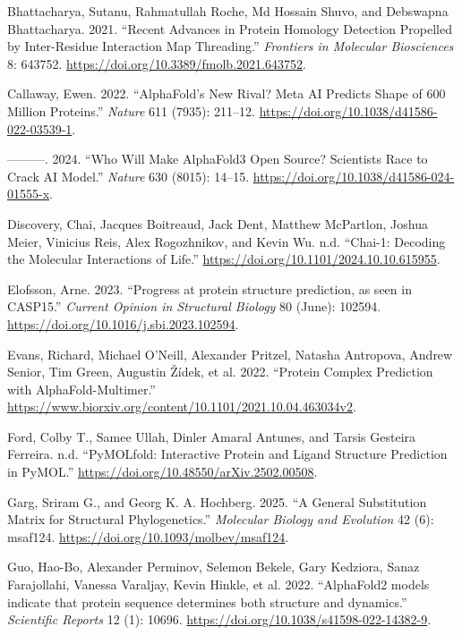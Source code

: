 \documentclass[
]{scrbook}
\newlength{\cslhangindent}
\newenvironment{CSLReferences}[2] %
 {\begin{list}{}{%
  \setlength{\itemindent}{0pt}
  \setlength{\leftmargin}{0pt}
  \setlength{\parsep}{0pt}
  \ifodd #1
   \setlength{\leftmargin}{\cslhangindent}
   \setlength{\itemindent}{-1\cslhangindent}
  \fi
  \setlength{\itemsep}{#2\baselineskip}}}
 {\end{list}}
\begin{document}
\begin{CSLReferences}{1}{0}
Bhattacharya, Sutanu, Rahmatullah Roche, Md Hossain Shuvo, and Debswapna
Bhattacharya. 2021. {``Recent Advances in Protein Homology Detection
Propelled by Inter-Residue Interaction Map Threading.''} \emph{Frontiers
in Molecular Biosciences} 8: 643752.
\url{https://doi.org/10.3389/fmolb.2021.643752}.

Callaway, Ewen. 2022. {``AlphaFold{'}s New Rival? Meta AI Predicts Shape
of 600 Million Proteins.''} \emph{Nature} 611 (7935): 211--12.
\url{https://doi.org/10.1038/d41586-022-03539-1}.

---------. 2024. {``Who Will Make AlphaFold3 Open Source? Scientists
Race to Crack AI Model.''} \emph{Nature} 630 (8015): 14--15.
\url{https://doi.org/10.1038/d41586-024-01555-x}.

Discovery, Chai, Jacques Boitreaud, Jack Dent, Matthew McPartlon, Joshua
Meier, Vinicius Reis, Alex Rogozhnikov, and Kevin Wu. n.d. {``Chai-1:
Decoding the Molecular Interactions of Life.''}
\url{https://doi.org/10.1101/2024.10.10.615955}.

Elofsson, Arne. 2023. {``Progress at protein structure prediction, as
seen in CASP15.''} \emph{Current Opinion in Structural Biology} 80
(June): 102594. \url{https://doi.org/10.1016/j.sbi.2023.102594}.

Evans, Richard, Michael O'Neill, Alexander Pritzel, Natasha Antropova,
Andrew Senior, Tim Green, Augustin Žídek, et al. 2022. {``Protein
Complex Prediction with AlphaFold-Multimer.''}
\url{https://www.biorxiv.org/content/10.1101/2021.10.04.463034v2}.

Ford, Colby T., Samee Ullah, Dinler Amaral Antunes, and Tarsis Gesteira
Ferreira. n.d. {``PyMOLfold: Interactive Protein and Ligand Structure
Prediction in PyMOL.''} \url{https://doi.org/10.48550/arXiv.2502.00508}.

Garg, Sriram G., and Georg K. A. Hochberg. 2025. {``A General
Substitution Matrix for Structural Phylogenetics.''} \emph{Molecular
Biology and Evolution} 42 (6): msaf124.
\url{https://doi.org/10.1093/molbev/msaf124}.

Guo, Hao-Bo, Alexander Perminov, Selemon Bekele, Gary Kedziora, Sanaz
Farajollahi, Vanessa Varaljay, Kevin Hinkle, et al. 2022. {``AlphaFold2
models indicate that protein sequence determines both structure and
dynamics.''} \emph{Scientific Reports} 12 (1): 10696.
\url{https://doi.org/10.1038/s41598-022-14382-9}.


\end{CSLReferences}
\end{document}

